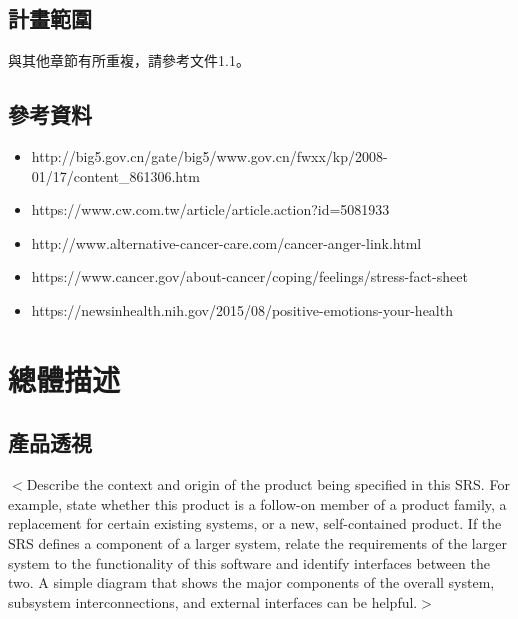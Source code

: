 \documentclass[12pt]{scrreprt}
\begin{document}
\section{計畫範圍}
與其他章節有所重複，請參考文件1.1。


\section{參考資料}
\begin{itemize}
\item{http://big5.gov.cn/gate/big5/www.gov.cn/fwxx/kp/2008-01/17/content_861306.htm}

\item{https://www.cw.com.tw/article/article.action?id=5081933}

\item{http://www.alternative-cancer-care.com/cancer-anger-link.html}

\item{https://www.cancer.gov/about-cancer/coping/feelings/stress-fact-sheet}

\item{https://newsinhealth.nih.gov/2015/08/positive-emotions-your-health}
\end{itemize}


\chapter{總體描述}

\section{產品透視} %
$<$Describe the context and origin of the product being specified in this SRS.  
For example, state whether this product is a follow-on member of a product 
family, a replacement for certain existing systems, or a new, self-contained 
product. If the SRS defines a component of a larger system, relate the 
requirements of the larger system to the functionality of this software and 
identify interfaces between the two. A simple diagram that shows the major 
components of the overall system, subsystem interconnections, and external 
interfaces can be helpful.$>$
\end{document}
